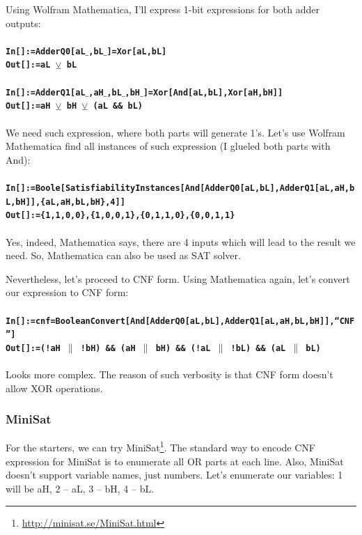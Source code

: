 Using Wolfram Mathematica, I'll express 1-bit expressions for both adder outputs:\\
\\
\textbf{\texttt{In[]:=AdderQ0[aL$\_$,bL$\_$]=Xor[aL,bL]}} \\
\textbf{\texttt{Out[]:=aL $\veebar$ bL}} \\
\\
\textbf{\texttt{In[]:=AdderQ1[aL$\_$,aH$\_$,bL$\_$,bH$\_$]=Xor[And[aL,bL],Xor[aH,bH]]}} \\
\textbf{\texttt{Out[]:=aH $\veebar$ bH $\veebar$ (aL \&\& bL)}} \\
\\
We need such expression, where both parts will generate 1's.
Let's use Wolfram Mathematica find all instances of such expression (I glueled both parts with And): \\
\\
\textbf{\texttt{In[]:=Boole[SatisfiabilityInstances[And[AdderQ0[aL,bL],AdderQ1[aL,aH,bL,bH]],\{aL,aH,bL,bH\},4]]}} \\
\textbf{\texttt{Out[]:=\{1,1,0,0\},\{1,0,0,1\},\{0,1,1,0\},\{0,0,1,1\}}} \\
\\
Yes, indeed, Mathematica says, there are 4 inputs which will lead to the result we need.
So, Mathematica can also be used as \ac{SAT} solver.

Nevertheless, let's proceed to CNF form. Using Mathematica again, let's convert our expression to CNF form:\\
\\
\textbf{\texttt{In[]:=cnf=BooleanConvert[And[AdderQ0[aL,bL],AdderQ1[aL,aH,bL,bH]],``CNF'']}} \\
\textbf{\texttt{Out[]:=(!aH $\|$ !bH) \&\& (aH $\|$ bH) \&\& (!aL $\|$ !bL) \&\& (aL $\|$ bL)}} \\
\\
Looks more complex. The reason of such verbosity is that CNF form doesn't allow XOR operations.

\subsubsection{MiniSat}

For the starters, we can try MiniSat\footnote{\url{http://minisat.se/MiniSat.html}}.
The standard way to encode CNF expression for MiniSat is to enumerate all OR parts at each line.
Also, MiniSat doesn't support variable names, just numbers.
Let's enumerate our variables: 1 will be aH, 2 -- aL, 3 -- bH, 4 -- bL.

